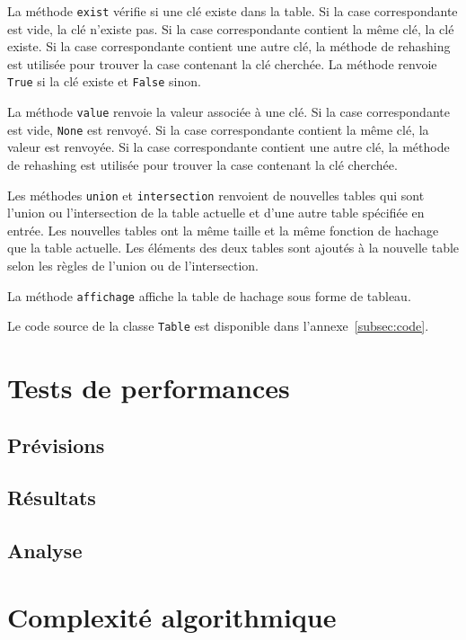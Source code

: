 \documentclass{article}
\begin{document}
    La méthode \texttt{exist} vérifie si une clé existe dans la table.
    Si la case correspondante est vide, la clé n'existe pas.
    Si la case correspondante contient la même clé, la clé existe.
    Si la case correspondante contient une autre clé, la méthode de rehashing est utilisée pour trouver la case contenant la clé cherchée.
    La méthode renvoie \texttt{True} si la clé existe et \texttt{False} sinon.

    La méthode \texttt{value} renvoie la valeur associée à une clé.
    Si la case correspondante est vide, \texttt{None} est renvoyé.
    Si la case correspondante contient la même clé, la valeur est renvoyée.
    Si la case correspondante contient une autre clé, la méthode de rehashing est utilisée pour trouver la case contenant la clé cherchée.

    Les méthodes \texttt{union} et \texttt{intersection} renvoient de nouvelles tables qui sont l'union ou l'intersection de la table actuelle et d'une autre table spécifiée en entrée.
    Les nouvelles tables ont la même taille et la même fonction de hachage que la table actuelle.
    Les éléments des deux tables sont ajoutés à la nouvelle table selon les règles de l'union ou de l'intersection.

    La méthode \texttt{affichage} affiche la table de hachage sous forme de tableau.

    Le code source de la classe \texttt{Table} est disponible dans l'annexe~\ref{subsec:code}.

    \section{Tests de performances}\label{sec:tests}




    \subsection{Prévisions}\label{subsec:previsions}
    \subsection{Résultats}\label{subsec:resultats}
    \subsection{Analyse}\label{subsec:analyse}
    \section{Complexité algorithmique}\label{sec:complexite}
\end{document}
